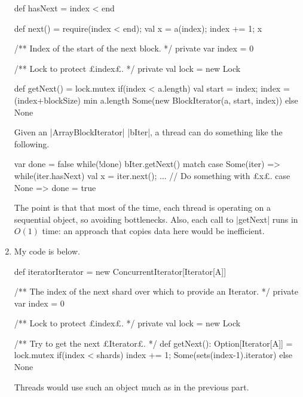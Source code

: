 \begin{answerI}
\begin{enumerate}
\begin{scala}
{{    def hasNext = index < end

    def next() = { require(index < end); val x = a(index); index += 1; x }
  }

  /** Index of the start of the next block. */
  private var index = 0

  /** Lock to protect £index£. */
  private val lock = new Lock

  def getNext() = lock.mutex{
    if(index < a.length){
      val start = index; index = (index+blockSize) min a.length
      Some(new BlockIterator(a, start, index))
    }
    else None
  }
}
\end{scala}
%
Given an |ArrayBlockIterator| |bIter|, a thread can do something like the
following.
%
\begin{scala}
  var done = false
  while(!done) bIter.getNext() match{
    case Some(iter) => 
      while(iter.hasNext){ 
        val x = iter.next(); ... // Do something with £x£. 
      }
    case None => done = true
  }
\end{scala}

The point is that that most of the time, each thread is operating on a
sequential object, so avoiding bottlenecks.  Also, each call to |getNext| runs
in $O(1)$ time: an approach that copies data here would be inefficient.


\item
My code is below.
\begin{scala}
  def iteratorIterator = new ConcurrentIterator[Iterator[A]]{
    /** The index of the next shard over which to provide an Iterator. */
    private var index = 0

    /** Lock to protect £index£. */
    private val lock = new Lock

    /** Try to get the next £Iterator£. */
    def getNext(): Option[Iterator[A]] = lock.mutex{
      if(index < shards){ index += 1; Some(sets(index-1).iterator) } 
      else None
    }
  }
\end{scala}
%
Threads would use such an object much as in the previous part.
\end{enumerate}
\end{answerI}
